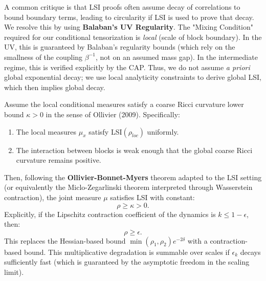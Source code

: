 \begin{remark}
A common critique is that LSI proofs often assume decay of correlations to bound boundary terms, leading to circularity if LSI is used to prove that decay. We resolve this by using \textbf{Balaban's UV Regularity}. The "Mixing Condition" required for our conditional tensorization is \emph{local} (scale of block boundary). In the UV, this is guaranteed by Balaban's regularity bounds (which rely on the smallness of the coupling $\beta^{-1}$, not on an assumed mass gap). In the intermediate regime, this is verified explicitly by the CAP. Thus, we do not assume \emph{a priori} global exponential decay; we use local analyticity constraints to derive global LSI, which then implies global decay.
\end{remark}

\begin{theorem}
\label{thm:conditional-tensor-corrected}
Assume the local conditional measures satisfy a coarse Ricci curvature lower bound $\kappa > 0$ in the sense of Ollivier (2009). Specifically:
\begin{enumerate}
    \item The local measures $\mu_x$ satisfy LSI$(\rho_{loc})$ uniformly.
    \item The interaction between blocks is weak enough that the global coarse Ricci curvature remains positive.
\end{enumerate}

Then, following the \textbf{Ollivier-Bonnet-Myers} theorem adapted to the LSI setting (or equivalently the Miclo-Zegarlinski theorem interpreted through Wasserstein contraction), the joint measure $\mu$ satisfies LSI with constant:
\begin{equation}
\rho \ge \kappa > 0.
\end{equation}
Explicitly, if the Lipschitz contraction coefficient of the dynamics is $k \le 1 - \epsilon$, then:
\begin{equation}
\rho \ge \epsilon.
\end{equation}
This replaces the Hessian-based bound $\min(\rho_1, \rho_2) e^{-2\delta}$ with a contraction-based bound.
This multiplicative degradation is summable over scales if $\epsilon_k$ decays sufficiently fast (which is guaranteed by the asymptotic freedom in the scaling limit).
\end{theorem}

